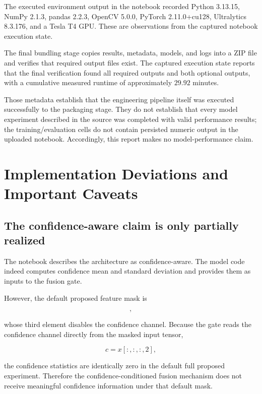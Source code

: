 \documentclass[11pt,a4paper]{article}
\begin{document}
The executed environment output in the notebook recorded Python 3.13.15, NumPy 2.1.3, pandas 2.2.3, OpenCV 5.0.0, PyTorch 2.11.0+cu128, Ultralytics 8.3.176, and a Tesla T4 GPU. These are observations from the captured notebook execution state.

The final bundling stage copies results, metadata, models, and logs into a ZIP file and verifies that required output files exist. The captured execution state reports that the final verification found all required outputs and both optional outputs, with a cumulative measured runtime of approximately $29.92$ minutes.

Those metadata establish that the engineering pipeline itself was executed successfully to the packaging stage. They do not establish that every model experiment described in the source was completed with valid performance results; the training/evaluation cells do not contain persisted numeric output in the uploaded notebook. Accordingly, this report makes no model-performance claim.

\section{Implementation Deviations and Important Caveats}

\subsection{The confidence-aware claim is only partially realized}

The notebook describes the architecture as confidence-aware. The model code indeed computes confidence mean and standard deviation and provides them as inputs to the fusion gate.

However, the default proposed feature mask is

\begin{equation}
[1,1,0,1,1,1,1,0],
\end{equation}

whose third element disables the confidence channel. Because the gate reads the confidence channel directly from the masked input tensor,

\begin{equation}
c=x[:,:, :,2],
\end{equation}

the confidence statistics are identically zero in the default full proposed experiment. Therefore the confidence-conditioned fusion mechanism does not receive meaningful confidence information under that default mask.
\end{document}
